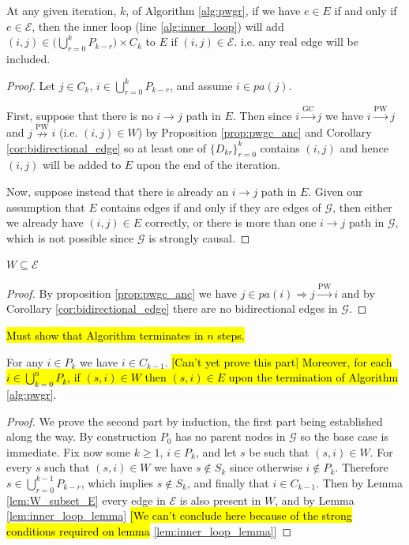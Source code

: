 \documentclass[12pt]{article}
\def\gc{\overset{\text{GC}}{\rightarrow}}  %
\def\pwgc{\overset{\text{PW}}{\rightarrow}}  %
\def\npwgc{\overset{\text{PW}}{\nrightarrow}}  %
\def\gcg{\mathcal{G}}  %
\newcommand{\pa}[1]{pa(#1)}  %
\begin{document}
\begin{lemma}
  \label{lem:inner_loop_lemma}
  At any given iteration, $k$, of Algorithm \ref{alg:pwgr}, if we have
  $e \in E$ if and only if $e \in \mathcal{E}$, then the inner loop (line \ref{alg:inner_loop})
  will add $(i, j) \in \big(\bigcup_{r = 0}^kP_{k - r}\big) \times C_k$ to $E$
  if $(i, j) \in \mathcal{E}$.  i.e. any real edge will be included.
\end{lemma}
\begin{proof}
  Let $j \in C_k$, $i \in \bigcup_{r = 0}^k P_{k - r}$, and assume
  $i \in \pa{j}$.

  First, suppose that there is no $i \rightarrow j$ path in $E$.  Then
  since $i \gc j$ we have $i \pwgc j$ and $j \npwgc i$ (i.e.
  $(i, j) \in W$) by Proposition \ref{prop:pwgc_anc} and Corollary
  \ref{cor:bidirectional_edge} so at least one of
  $\{D_{kr} \}_{r = 0}^k$ contains $(i, j)$ and hence $(i, j)$ will be
  added to $E$ upon the end of the iteration.

  Now, suppose instead that there is already an $i \rightarrow j$ path
  in $E$.  Given our assumption that $E$ contains edges if and only if
  they are edges of $\gcg$, then either we already have $(i, j) \in E$
  correctly, or there is more than one $i \rightarrow j$ path in
  $\gcg$, which is not possible since $\gcg$ is strongly causal.
\end{proof}

\begin{lemma}
  \label{lem:W_subset_E}
  $W \subseteq \mathcal{E}$
\end{lemma}
\begin{proof}
  By proposition \ref{prop:pwgc_anc} we have
  $j \in \pa{i} \Rightarrow j \pwgc i$ and by Corollary \ref{cor:bidirectional_edge}
  there are no bidirectional edges in $\gcg$.
\end{proof}

\hl{Must show that Algorithm terminates in $n$ steps.}
\begin{lemma}
  For any $i \in P_k$ we have $i \in C_{k - 1}$.  \hl{[Can't yet prove
    this part] Moreover, for each $i \in \bigcup_{k = 0}^n P_k$, if
    $(s, i) \in W$ then $(s, i) \in E$ upon the termination of
    Algorithm} \ref{alg:pwgr}.
\end{lemma}
\begin{proof}
  We prove the second part by induction, the first part being
  established along the way.  By construction $P_0$ has no parent
  nodes in $\gcg$ so the base case is immediate.  Fix now some
  $k \ge 1$, $i \in P_k$, and let $s$ be such that $(s, i) \in W$.
  For every $s$ such that $(s, i) \in W$ we have $s \not\in S_k$ since
  otherwise $i \not\in P_k$.  Therefore
  $s \in \bigcup_{r = 0}^{k - 1}P_{k - r}$, which implies
  $s \not\in S_k$, and finally that $i \in C_{k - 1}$.  Then by Lemma
  \ref{lem:W_subset_E} every edge in $\mathcal{E}$ is also present in
  $W$, and by Lemma \ref{lem:inner_loop_lemma} \hl{[We can't conclude
    here because of the strong conditions required on lemma}
    \ref{lem:inner_loop_lemma}]
\end{proof}
\end{document}
